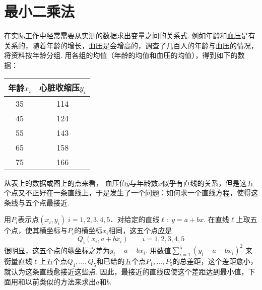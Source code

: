 \section*{最小二乘法}
在实际工作中经常需要从实测的数据求出变量之间的关系式. 例如年龄和血压是有关系的，随着年龄的增长，血压是会增高的，调查了几百人的年龄与血压的情况，将资料按年龄分组. 用各组的均值（年龄的均值和血压的均值），得到如下的数据：

\begin{minipage}{.35\textwidth}
\begin{center}
    \begin{tabular}{cc}
\hline
        年龄$x_i$ & 心脏收缩压$y_i$\\
\hline
35&114\\
45&124\\
55&143\\
65&158\\
75&166\\
\hline
    \end{tabular}
\end{center}
\end{minipage}\hfill
\begin{minipage}{.6\textwidth}
\centering
{}

\end{minipage}

从表上的数据或图上的点来看，
血压值$y$与年龄数$x$似乎有直线的关系，但是这五个点又不正好在一条直线上，于是发生了一个问题：如何求一个直线方程，使得这条线与五个点最接近.

用$P_i$表示点$(x_i,y_i)\; i=1,2,3,4,5$．对给定的直线$\ell:\; y=a+bx$. 在直线$\ell$上取五个点，使其横坐标与$P_i$的横坐标$x_i$相同，这五个点应是
\[Q_i(x_i, a+bx_i) \qquad i=1,2,3,4,5\]
很明显，这五个点的纵坐标之差为$y_i-a-bx_i$. 用数值$\sum\limits^5_{i=1}(y_i-a-bx_i)^2$
来衡量直线$\ell$上五个点$Q_1,\ldots,Q_5$和已给的五个点$P_1,\ldots,P_5$的总差距，这个差距愈小，就认为这条直线愈接近这些点. 因此，最接近的直线应使这个差距达到最小值，下
面用和以前类似的方法来求出$a$和$b$.

